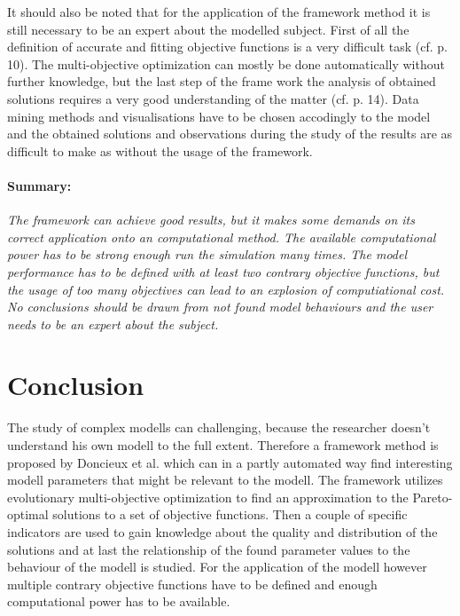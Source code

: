 \documentclass[12pt,twoside]{article}
\theoremstyle{plain}
\theoremstyle{definition}
\theoremstyle{remark}
\begin{document}
It should also be noted that for the application of the framework method it is still necessary to be an expert about the modelled subject.
First of all the definition of accurate and fitting objective functions is a very difficult task (cf. \cite{doncieux2015multi} p. 10). 
The multi-objective optimization can mostly be done automatically without further knowledge, but the last step of the frame work the analysis of obtained solutions requires a very good understanding of the matter (cf. \cite{doncieux2015multi} p. 14). 
Data mining methods and visualisations have to be chosen accodingly to the model and the obtained solutions and observations during the study of the results are as difficult to make as without the usage of the framework.

\paragraph{Summary:}
\textit{
	The framework can achieve good results, but it makes some demands on its correct application onto an computational method.
	The available computational power has to be strong enough run the simulation many times.
	The model performance has to be defined with at least two contrary objective functions, but the usage of too many objectives can lead to an explosion of computiational cost.
	No conclusions should be drawn from not found model behaviours and the user needs to be an expert about the subject.
}


\section{Conclusion}
\label{sec:concl}

The study of complex modells can challenging, because the researcher doesn't understand his own modell to the full extent.
Therefore a framework method is proposed by Doncieux et al. \cite{doncieux2015multi} which can in a partly automated way find interesting modell parameters that might be relevant to the modell. 
The framework utilizes evolutionary multi-objective optimization to find an approximation to the Pareto-optimal solutions to a set of objective functions.
Then a couple of specific indicators are used to gain knowledge about the quality and distribution of the solutions and at last the relationship of the found parameter values to the behaviour of the modell is studied.
For the application of the modell however multiple contrary objective functions have to be defined and enough computational power has to be available.\medskip
\end{document}
